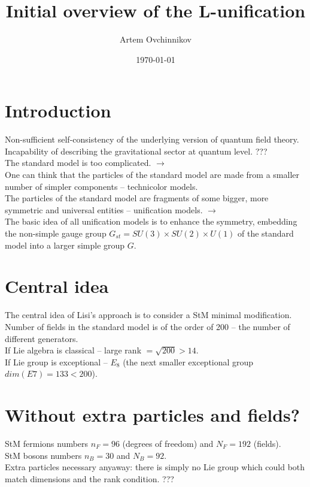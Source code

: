 \documentclass{article}
\title{Initial overview of the L-unification}
\author{Artem Ovchinnikov}
\date{\today}
\begin{document}
\maketitle

\section{Introduction}
Non-sufficient self-consistency of the underlying version of quantum field theory. \\
Incapability of describing the gravitational sector at quantum level. ??? \\
The standard model is too complicated. $\xrightarrow{}$ \\
One can think that the particles of the standard model are made from a smaller number of simpler components – technicolor models. \\
The particles of the standard model are fragments of some bigger, more symmetric and universal entities – unification models. $\xrightarrow{}$ \\
The basic idea of all unification models is to enhance the symmetry, embedding the non-simple gauge group $ G_{st} = SU (3) \times SU (2) \times U (1) $ of the standard model into a larger simple group $G$.

\section{Central idea}
The central idea of Lisi’s approach is to consider a StM minimal modification. \\
Number of fields in the standard model is of the order of 200 -- the number of different generators. \\
If Lie algebra is classical -- large rank $= \sqrt {200} > 14$. \\
If Lie group is exceptional -- $E_8$ (the next smaller exceptional group $dim(E7) = 133 < 200$). \\

\section{Without extra particles and fields?}
StM fermions numbers $n_F = 96$ (degrees of freedom) and $N_F = 192$ (fields). \\
StM bosons numbers $n_B = 30$ and $N_B = 92$. \\
Extra particles necessary anyaway: there is simply no Lie group which could both match dimensions and the rank condition. ???
\end{document}
